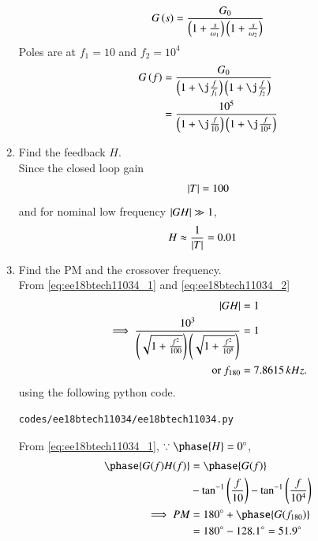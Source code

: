 \begin{enumerate}[label=\arabic*.,ref=\theenumi]
\begin{align}
    G\left(s\right) = \frac{G_{0}}{\left(1+\frac{s}{\omega_{1}}\right)\left(1+\frac{s}{\omega_{2}}\right)}
\end{align}
Poles are at $f_{1} =10$ and $f_{2} = 10^{4}$
\begin{align}
G\brak{f} &= \frac{G_{0}}{\brak{1+\j\frac{f}{f_{1}}}\brak{1+\j\frac{f}{f_{2}}}}
\\
&= \frac{10^{5}}{\brak{1+\j\frac{f}{10}}\brak{1+\j\frac{f}{10^{4}}}}
\label{eq:ee18btech11034_1}
\end{align}
\item Find the feedback $H$.
\\
\solution  Since the closed loop gain 
\begin{align}
    \left\vert T\right\vert = 100
\end{align}
and for nominal low frequency $\left\vert GH\right\vert \gg 1$,
\begin{align}
    H &\approx  \frac{1}{\abs{T}}= 0.01
    \label{eq:ee18btech11034_2}
\end{align}
\item Find the PM and the crossover frequency.
\\
\solution 
From \eqref{eq:ee18btech11034_1} and \eqref{eq:ee18btech11034_2}
\begin{align}
\left\vert GH\right\vert &= 1
\\
\implies    \frac{10^{3}}{\left(\sqrt{1+\frac{f^2}{100}}\right)\left(\sqrt{1+\frac{f^2}{10^{8}}}\right)} &= 1
\\
\text{or } f_{180} &= 7.8615 \, kHz. 
\end{align}
using the following python code.
\begin{lstlisting}
codes/ee18btech11034/ee18btech11034.py
\end{lstlisting}
From \eqref{eq:ee18btech11034_1}, $\because \phase{H} = 0\degree$,
\begin{align}
\label{eq:ee18btech11034_phaseGH}
\phase{G(f)H(f)} &= \phase{G(f)}
\\
&-\tan^{-1}\brak{\frac{f}{10}} -\tan^{-1}\brak{\frac{f}{10^{4}}}
\\
\implies PM &= 180 \degree + \phase{G(f_{180})} 
\\
&= 180 \degree -128.1 \degree = 51.9 \degree
\end{align}


\end{enumerate}
